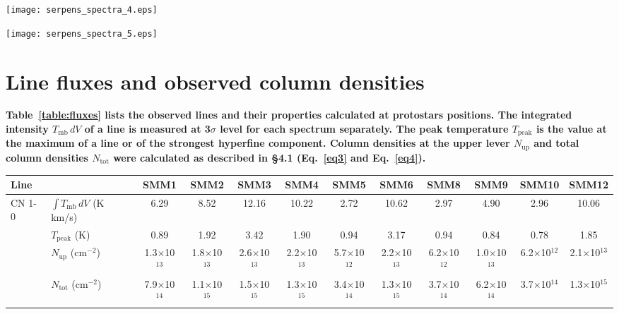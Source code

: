 \documentclass{aa}
\begin{document}
\begin{appendix}
\begin{figure*}
\centering 
\texttt{[image: serpens\_spectra\_4.eps]}
\label{Spectra4} 
\end{figure*}

\begin{figure*} 
\centering
\texttt{[image: serpens\_spectra\_5.eps]} 
\caption{Serpens Main sources spectra of CO(6-5), C$^{34}$S(3-2), CS(3-2), H$^{13}$CN(2-1), H$^{13}$CN(1-0),
 HCN(1-0) and CN(1-0) lines.} 
 \label{Spectra_all}
\end{figure*}

\section{Line fluxes \textbf{and observed column densities}}

\textbf{Table~\ref{table:fluxes} lists the observed lines and their properties calculated at protostars positions. The integrated intensity $T_{\mathrm{mb}} \, dV$ of a line is measured at 3$\sigma$ level for each spectrum separately. The peak temperature $T_\mathrm{peak}$ is the value at the maximum of a line or of the strongest hyperfine component. Column densities at the upper lever $N_\mathrm{up}$ and total column densities $N_\mathrm{tot}$ were calculated as described in \S 4.1 (Eq.~\ref{eq3} and Eq.~\ref{eq4}).}

\begin{sidewaystable*}
\caption{Integrated fluxes of the observed line at the positions of protostars}\label{table:fluxes}
\centering
\begin{tabular}{l l c c c c c c c c c c} 
\hline\hline             
Line &  & SMM1 & SMM2 & SMM3 & SMM4 & SMM5 & SMM6 & SMM8 & SMM9 & SMM10 & SMM12 \\
\hline \multirow{4}{*}{CN 1-0} & $\int{T_{\mathrm{mb}} \, dV}$ (K km/s) & 6.29 & 8.52 & 12.16 & 10.22 & 2.72 & 10.62 & 2.97 & 4.90 & 2.96 & 10.06 \\
& $T_\mathrm{peak}$ (K) & 0.89 & 1.92 & 3.42 & 1.90 & 0.94 & 3.17 & 0.94 & 0.84 & 0.78 & 1.85 \\
& $N_\mathrm{up}$ (cm$^{-2}$) & 1.3$\times$10$^{13}$ & 1.8$\times$10$^{13}$ & 2.6$\times$10$^{13}$ & 2.2$\times$10$^{13}$ & 5.7$\times$10$^{12}$ & 2.2$\times$10$^{13}$ & 6.2$\times$10$^{12}$ & 1.0$\times$10$^{13}$ & 6.2$\times$10$^{12}$ & 2.1$\times$10$^{13}$ \\
& $N_\mathrm{tot}$ (cm$^{-2}$) & 7.9$\times$10$^{14}$ & 1.1$\times$10$^{15}$ & 1.5$\times$10$^{15}$ & 1.3$\times$10$^{15}$ & 3.4$\times$10$^{14}$ & 1.3$\times$10$^{15}$ & 3.7$\times$10$^{14}$ & 6.2$\times$10$^{14}$ & 3.7$\times$10$^{14}$ & 1.3$\times$10$^{15}$\\


\end{tabular}
\end{sidewaystable*}
\end{appendix}
\end{document}
